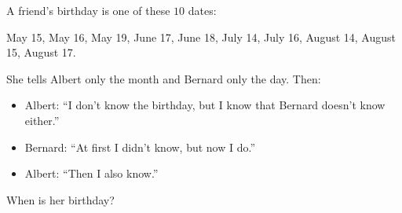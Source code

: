 A friend's birthday is one of these $10$ dates:
\begin{center}May 15, May 16, May 19, June 17, June 18, July 14, July 16, August 14, August 15, August 17.\end{center}
She tells Albert only the month and Bernard only the day. Then:
\begin{itemize}
\item Albert: ``I don't know the birthday, but I know that Bernard doesn't know either.''
\item Bernard: ``At first I didn't know, but now I do.''
\item Albert: ``Then I also know.''
\end{itemize}
When is her birthday?
